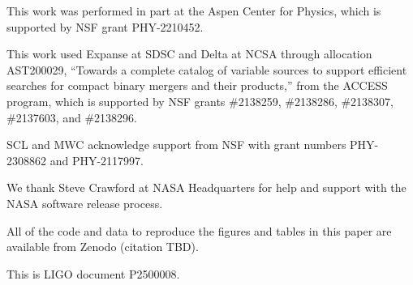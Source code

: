 \documentclass[twocolumn,times]{aastex631}
\begin{document}
\begin{acknowledgments}
This work was performed in part at the Aspen Center for Physics, which is supported by \ac{NSF} grant PHY-2210452.

This work used Expanse at \ac{SDSC} and Delta at \ac{NCSA} through allocation AST200029, ``Towards a complete catalog of variable sources to support efficient searches for compact binary mergers and their products,'' from the \ac{ACCESS} program, which is supported by \ac{NSF} grants \#2138259, \#2138286, \#2138307, \#2137603, and \#2138296.

SCL and MWC acknowledge support from \ac{NSF} with grant numbers PHY-2308862 and PHY-2117997.

We thank Steve Crawford at NASA Headquarters for help and support with the NASA software release process.

All of the code and data to reproduce the figures and tables in this paper are available from Zenodo (citation TBD).

This is LIGO document P2500008.
\end{acknowledgments}

\vspace{5mm}

{}

\end{document}
